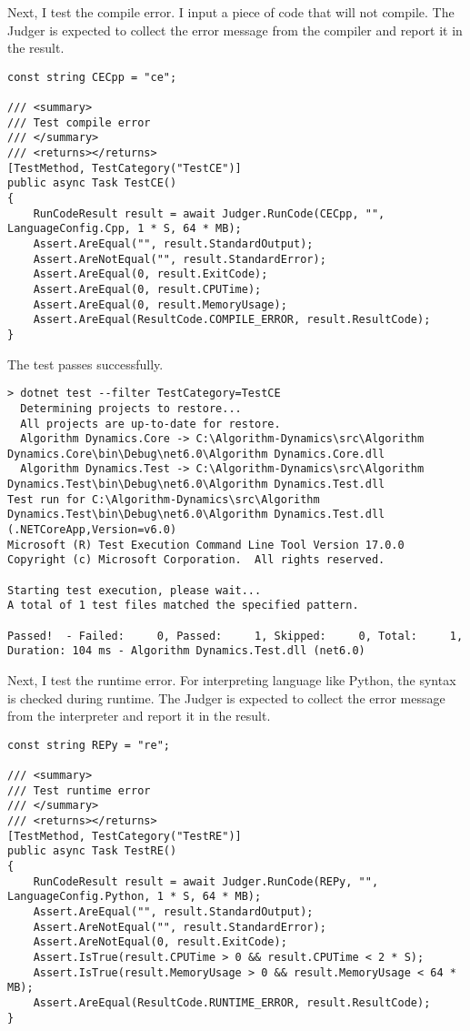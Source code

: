 \documentclass[report.tex]{subfiles}
\begin{document}
Next, I test the compile error. I input a piece of code that will not compile. The Judger is expected to collect the error message from the compiler and report it in the result.

\begin{verbatim}
const string CECpp = "ce";

/// <summary>
/// Test compile error
/// </summary>
/// <returns></returns>
[TestMethod, TestCategory("TestCE")]
public async Task TestCE()
{
    RunCodeResult result = await Judger.RunCode(CECpp, "", LanguageConfig.Cpp, 1 * S, 64 * MB);
    Assert.AreEqual("", result.StandardOutput);
    Assert.AreNotEqual("", result.StandardError);
    Assert.AreEqual(0, result.ExitCode);
    Assert.AreEqual(0, result.CPUTime);
    Assert.AreEqual(0, result.MemoryUsage);
    Assert.AreEqual(ResultCode.COMPILE_ERROR, result.ResultCode);
}
\end{verbatim}

The test passes successfully.

\begin{verbatim}
> dotnet test --filter TestCategory=TestCE
  Determining projects to restore...
  All projects are up-to-date for restore.
  Algorithm Dynamics.Core -> C:\Algorithm-Dynamics\src\Algorithm Dynamics.Core\bin\Debug\net6.0\Algorithm Dynamics.Core.dll
  Algorithm Dynamics.Test -> C:\Algorithm-Dynamics\src\Algorithm Dynamics.Test\bin\Debug\net6.0\Algorithm Dynamics.Test.dll
Test run for C:\Algorithm-Dynamics\src\Algorithm Dynamics.Test\bin\Debug\net6.0\Algorithm Dynamics.Test.dll (.NETCoreApp,Version=v6.0)
Microsoft (R) Test Execution Command Line Tool Version 17.0.0
Copyright (c) Microsoft Corporation.  All rights reserved.

Starting test execution, please wait...
A total of 1 test files matched the specified pattern.

Passed!  - Failed:     0, Passed:     1, Skipped:     0, Total:     1, Duration: 104 ms - Algorithm Dynamics.Test.dll (net6.0)
\end{verbatim}

Next, I test the runtime error. For interpreting language like Python, the syntax is checked during runtime. The Judger is expected to collect the error message from the interpreter and report it in the result.

\begin{verbatim}
const string REPy = "re";

/// <summary>
/// Test runtime error
/// </summary>
/// <returns></returns>
[TestMethod, TestCategory("TestRE")]
public async Task TestRE()
{
    RunCodeResult result = await Judger.RunCode(REPy, "", LanguageConfig.Python, 1 * S, 64 * MB);
    Assert.AreEqual("", result.StandardOutput);
    Assert.AreNotEqual("", result.StandardError);
    Assert.AreNotEqual(0, result.ExitCode);
    Assert.IsTrue(result.CPUTime > 0 && result.CPUTime < 2 * S);
    Assert.IsTrue(result.MemoryUsage > 0 && result.MemoryUsage < 64 * MB);
    Assert.AreEqual(ResultCode.RUNTIME_ERROR, result.ResultCode);
}
\end{verbatim}
\end{document}

